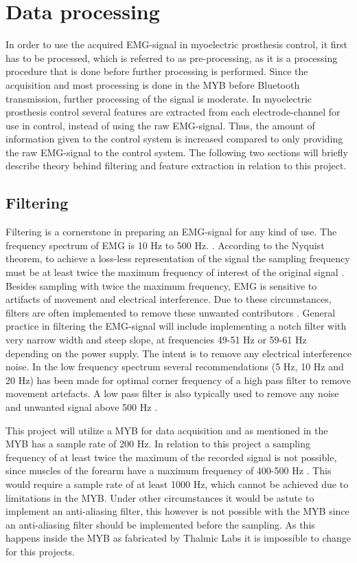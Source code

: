 \section{Data processing} \label{sec:BG:dataProcessing}


In order to use the acquired EMG-signal in myoelectric prosthesis control, it first has to be processed, which is referred to as pre-processing, as it is a processing procedure that is done before further processing is performed. Since the acquisition and most processing is done in the MYB before Bluetooth transmission, further processing of the signal is moderate. In myoelectric prosthesis control several features are extracted from each electrode-channel for use in control, instead of using the raw EMG-signal. Thus, the amount of information given to the control system is increased compared to only providing the raw EMG-signal to the control system. The following two sections will briefly describe theory behind filtering and feature extraction in relation to this project. 


\subsection{Filtering} \label{sub:BG:filtering} %

Filtering is a cornerstone in preparing an EMG-signal for any kind of use. The frequency spectrum of EMG is 10 Hz to 500 Hz. \cite{Cram2012}. According to the Nyquist theorem, to achieve a loss-less representation of the signal the sampling frequency must be at least twice the maximum frequency of interest of the original signal \cite{Pozzo2004}. Besides sampling with twice the maximum frequency, EMG is sensitive to artifacts of movement and electrical interference. Due to these circumstances, filters are often implemented to remove these unwanted contributors \cite{DeLuca2010}. 
General practice in filtering the EMG-signal will include implementing a notch filter with very narrow width and steep slope, at frequencies 49-51 Hz or 59-61 Hz depending on the power supply. The intent is to remove any electrical interference noise. In the low frequency spectrum several recommendations (5 Hz, 10 Hz and 20 Hz) has been made for optimal corner frequency of a high pass filter to remove movement artefacts. A low pass filter is also typically used to remove any noise and unwanted signal above 500 Hz \cite{Cram2012}. 

This project will utilize a MYB for data acquisition and as mentioned in  the MYB has a sample rate of 200 Hz. In relation to this project a sampling frequency of at least twice the maximum of the recorded signal is not possible, since muscles of the forearm have a maximum frequency of 400-500 Hz \cite{Cram2012}. This would require a sample rate of at least 1000 Hz, which cannot be achieved due to limitations in the MYB. Under other circumstances it would be astute to implement an anti-aliasing filter, this however is not possible with the MYB since an anti-aliasing filter should be implemented before the sampling. As this happens inside the MYB as fabricated by Thalmic Labs it is impossible to change for this projects. 

